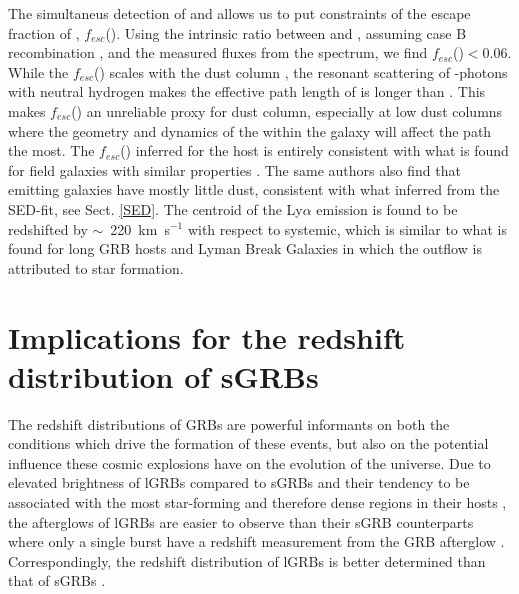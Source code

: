 \documentclass{aa}    %
\begin{document}
The simultaneus detection of \lya{} and \ha{} allows us to put constraints of
the escape fraction of \lya{}, $f_{esc}$(\lya). Using the intrinsic ratio
between \ha{} and \lya{}, assuming case B recombination
\citep{Brocklehurst1971}, and the measured fluxes from the spectrum, we find
$f_{esc}$(\lya)$ < 0.06$. While the $f_{esc}$(\lya) scales with the dust column
\citep{Hayes2011}, the resonant scattering of \lya{}-photons with neutral
hydrogen makes the effective path length of \lya{} is longer than \ha{}
\citep{Atek2009}. This makes $f_{esc}$(\lya) an unreliable proxy for dust
column, especially at low dust columns \citep{Atek2014} where the geometry and
dynamics of the \hi{} within the galaxy will affect the \lya{} path the most.
The $f_{esc}$(\lya) inferred for the host is entirely consistent with what is
found for field galaxies with similar properties \citep{Oyarzun2017}. The same
authors also find that \lya{} emitting galaxies have mostly little dust,
consistent with what inferred from the SED-fit, see Sect. \ref{SED}. The
centroid of the Ly$\alpha$ emission is found to be redshifted by
$\sim$~220~km~s$^{-1}$ with respect to systemic, which is similar to what is
found for long GRB hosts \citep{Milvang-Jensen2012a} and Lyman Break Galaxies
\citep{Shapley2003a} in which the outflow is attributed to star formation.



\section{Implications for the redshift distribution of sGRBs}


The redshift distributions of GRBs are powerful informants on both the
conditions which drive the formation of these events, but also on the potential
influence these cosmic explosions have on the evolution of the universe. Due to
elevated brightness of lGRBs compared to sGRBs \citep{Berger2014} and their
tendency to be associated with the most star-forming and therefore dense regions
in their hosts \citep{Fruchter2006, Lyman2017}, the afterglows of lGRBs are
easier to observe than their sGRB counterparts where only a single burst have a
redshift measurement from the GRB afterglow \citep{Cucchiara2013,
	DeUgartePostigo2014c}. Correspondingly, the redshift distribution of lGRBs is
better determined than that of sGRBs \citep[e.g., see][]{Jakobsson2012a,
	DAvanzo2015, Perley2016d}.
\end{document}
